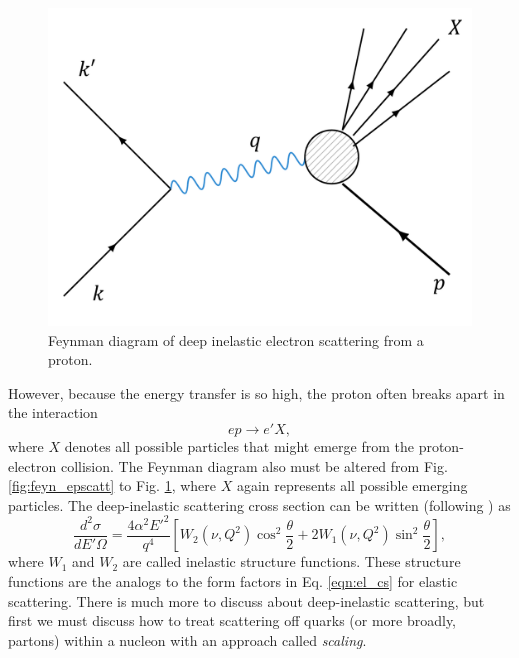\begin{figure}[h!]
	\centering
	\includegraphics[width=0.6\linewidth]{figures/feyn_inelscatt.png}
	\caption{Feynman diagram of deep inelastic electron scattering from a proton.}
	\label{fig:feyn_inelscatt}
\end{figure}

However, because the energy transfer is so high, the proton often breaks apart in the interaction
\begin{equation}
ep \longrightarrow e'X,
\end{equation}
where $X$ denotes all possible particles that might emerge from the proton-electron collision. The Feynman diagram also must be altered from Fig. \ref{fig:feyn_epscatt} to Fig. \ref{fig:feyn_inelscatt}, where $X$ again represents all possible emerging particles. The deep-inelastic scattering cross section can be written (following \cite{book:halzen}) as
\begin{equation}
\frac{d^2\sigma}{dE'\Omega} = \frac{4\alpha^2E'^2}{q^4} \left[ W_2(\nu,Q^2)\cos^2\frac{\theta}{2} +2W_1(\nu,Q^2) \sin^2 \frac{\theta}{2} \right],
\end{equation}
where $W_1$ and $W_2$ are called inelastic structure functions. These structure functions are the analogs to the form factors in Eq. \ref{eqn:el_cs} for elastic scattering. There is much more to discuss about deep-inelastic scattering, but first we must discuss how to treat scattering off quarks (or more broadly, partons) within a nucleon with an approach called \textit{scaling}.


